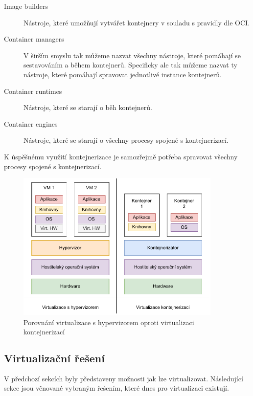 \begin{description}
    \item[Image builders] Nástroje, které umožňují vytvářet kontejnery v souladu s pravidly dle OCI.
    \item[Container managers] V širším smyslu tak můžeme nazvat všechny nástroje, které pomáhají se sestavováním a během kontejnerů. Specificky ale tak můžeme nazvat ty nástroje, které pomáhají spravovat jednotlivé instance kontejnerů.
    \item[Container runtimes] Nástroje, které se starají o běh kontejnerů.
    \item[Container engines] Nástroje, které se starají o všechny procesy spojené s  kontejnerizací.
\end{description}

K úspěšnému využití kontejnerizace je samozřejmě potřeba spravovat všechny procesy spojené s kontejnerizací. 

\begin{figure}[htbp]
    \centering 
    \includegraphics[width=0.9\textwidth]{assets/img/containerization.pdf}
    \caption{Porovnání virtualizace s hypervizorem oproti virtualizaci kontejnerizací}
    \label{fig:containerization}
\end{figure}


\subsection{Virtualizační řešení}

V předchozí sekcích byly představeny možnosti jak lze virtualizovat. Následující sekce jsou věnované vybraným řešením, které dnes pro virtualizaci existují.

